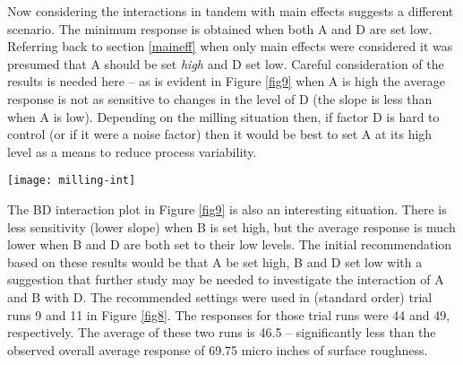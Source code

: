 Now considering the interactions in tandem with main effects suggests a different scenario.  The minimum response is obtained when both A and D are set low. Referring back to section \ref{maineff} when only main effects were considered it was presumed that A should be set \textit{high} and D set low.  Careful consideration of the results is needed here -- as is evident in Figure \ref{fig9} when A is high the average response is not as sensitive to changes in the level of D (the slope is less than when A is low).  Depending on the milling situation then, if factor D is hard to control (or if it were a noise factor) then it would be best to set A at its high level as a means to reduce process variability.

\begin{sidewaysfigure}[h]\caption{Milling Experiment Interaction Plots}\label{fig9}
\begin{center}

\texttt{[image: milling-int]}

\end{center}
\end{sidewaysfigure}

The BD interaction plot in Figure \ref{fig9} is also an interesting situation. There is less sensitivity (lower slope) when B is set high, but the average response is much lower when B and D are both set to their low levels. The initial recommendation based on these results would be that A be set high, B and D set low with a suggestion that further study may be needed to investigate the interaction of A and B with D. The recommended settings were used in (standard order) trial runs 9 and 11 in Figure \ref{fig8}. The responses for those trial runs were 44 and 49, respectively.  The average of these two runs is 46.5 -- significantly less than the observed overall average response of 69.75 micro inches of surface roughness.